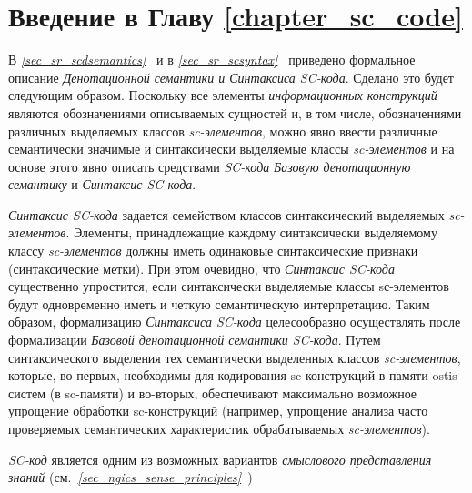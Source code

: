 \section*{Введение в Главу \ref{chapter_sc_code}}

В \textit{\ref{sec_sr_scdsemantics}~} и в \textit{\ref{sec_sr_scsyntax}~} приведено формальное описание \textit{Денотационной семантики и Синтаксиса SC-кода}. Сделано это будет следующим образом. Поскольку все элементы \textit{информационных конструкций} являются обозначениями описываемых сущностей и, в том числе, обозначениями различных выделяемых классов \textit{sc-элементов}, можно явно ввести различные семантически значимые и синтаксически выделяемые классы \textit{sc-элементов} и на основе этого явно описать средствами \textit{SC-кода} \textit{Базовую денотационную семантику} и \textit{Синтаксис SC-кода}.
 
\textit{Синтаксис SC-кода} задается семейством классов синтаксический выделяемых \textit{sc-элементов}. Элементы, принадлежащие каждому синтаксически выделяемому классу \textit{sc-элементов} должны иметь одинаковые синтаксические признаки (синтаксические метки). При этом очевидно, что \textit{Синтаксис SC-кода} существенно упростится, если синтаксически выделяемые классы sс-элементов будут одновременно иметь и четкую семантическую интерпретацию. Таким образом, формализацию \textit{Синтаксиса SC-кода} целесообразно осуществлять после формализации \textit{Базовой денотационной семантики SC-кода}. Путем синтаксического выделения тех семантически выделенных классов \textit{sc-элементов}, которые, во-первых, необходимы для кодирования sc-конструкций в памяти ostis-систем (в sc-памяти) и во-вторых, обеспечивают максимально возможное упрощение обработки sc-конструкций (например, упрощение анализа часто проверяемых семантических характеристик обрабатываемых \textit{sc-элементов}).

\textit{SC-код} является одним из возможных вариантов \textit{смыслового представления знаний} (см.\textit{~\ref{sec_ngics_sense_principles}~}) 

